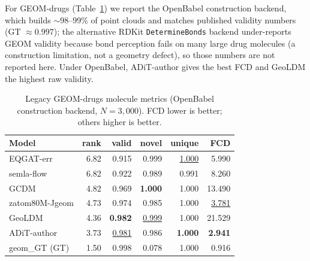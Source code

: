 \documentclass[11pt]{article}
\begin{document}
For GEOM-drugs (Table~\ref{tab:legacy_geom}) we report the OpenBabel construction backend,
which builds $\sim$98--99\% of point clouds and matches published validity numbers
(GT $\approx0.997$); the alternative RDKit \texttt{DetermineBonds} backend under-reports GEOM
validity because bond perception fails on many large drug molecules (a construction
limitation, not a geometry defect), so those numbers are not reported here. Under OpenBabel,
ADiT-author gives the best FCD and GeoLDM the highest raw validity.

\begin{table}[H]
\centering
\small
\caption{Legacy GEOM-drugs molecule metrics (OpenBabel construction backend, $N=3{,}000$).
FCD lower is better; others higher is better.}
\label{tab:legacy_geom}
\begin{tabular}{l r r r r r}
\toprule
Model & rank & valid & novel & unique & FCD \\
\midrule
EQGAT-err      & 6.82 & 0.915 & 0.999 & \underline{1.000} & 5.990 \\
semla-flow     & 6.82 & 0.922 & 0.989 & 0.991 & 8.260 \\
GCDM           & 4.82 & 0.969 & \textbf{1.000} & 1.000 & 13.490 \\
zatom80M-Jgeom & 4.73 & 0.974 & 0.985 & 1.000 & \underline{3.781} \\
GeoLDM         & 4.36 & \textbf{0.982} & \underline{0.999} & 1.000 & 21.529 \\
ADiT-author    & 3.73 & \underline{0.981} & 0.986 & \textbf{1.000} & \textbf{2.941} \\
\midrule
geom\_GT (GT)  & 1.50 & 0.998 & 0.078 & 1.000 & 0.916 \\
\bottomrule
\end{tabular}
\end{table}
\end{document}
